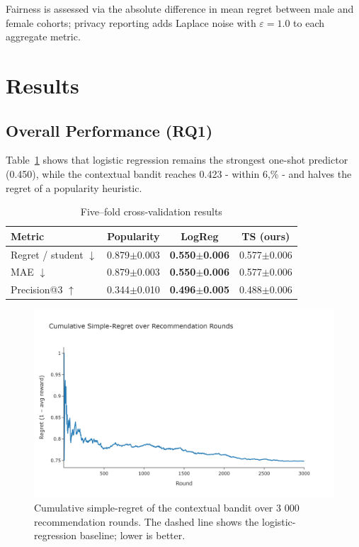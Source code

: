 \documentclass[conference]{IEEEtran}
\begin{document}
Fairness is assessed via the absolute difference in mean regret between male and female cohorts; privacy reporting adds Laplace noise with $\varepsilon\!=\!1.0$ to each aggregate metric.



\section{Results}

\subsection{Overall Performance (RQ1)}
Table~\ref{tab:cv} shows that logistic regression remains the strongest one-shot predictor (0.450), while the contextual bandit reaches 0.423 - within 6,\% - and halves the regret of a popularity heuristic.

\begin{table}[tb] \centering \caption{Five–fold cross-validation results} \label{tab:cv} \begin{tabular}{lccc} \toprule \textbf{Metric} & \textbf{Popularity} & \textbf{LogReg} & \textbf{TS (ours)} \\ \midrule Regret / student $\downarrow$ & 0.879$\pm$0.003 & \textbf{0.550$\pm$0.006} & 0.577$\pm$0.006 \\ MAE $\downarrow$ & 0.879$\pm$0.003 & \textbf{0.550$\pm$0.006} & 0.577$\pm$0.006 \\ Precision@3 $\uparrow$ & 0.344$\pm$0.010 & \textbf{0.496$\pm$0.005} & 0.488$\pm$0.006 \\ \bottomrule \end{tabular} \end{table}


\begin{figure}[!t]
  \centering
  \includegraphics[width=\columnwidth]{figure3_regret.png} %
  \caption{Cumulative simple-regret of the contextual bandit over 3 000 recommendation rounds.  The dashed line shows the logistic-regression baseline; lower is better.}
  \label{fig:regret}
\end{figure}
\end{document}
